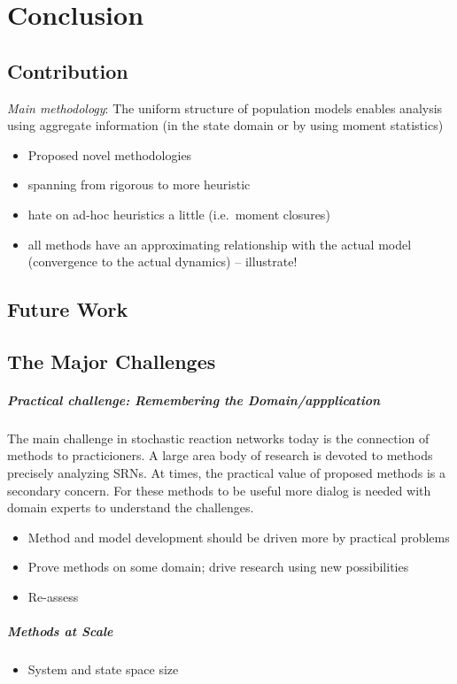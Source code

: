 \chapter{Conclusion}
\section{Contribution}
\emph{Main methodology}: The uniform structure of population models enables analysis using aggregate information (in the state domain or by using moment statistics)
\begin{itemize}
  \item Proposed novel methodologies
  \item spanning from rigorous to more heuristic
  \item hate on ad-hoc heuristics a little (i.e.\ moment closures)
  \item all methods have an approximating relationship with the actual model (convergence to the actual dynamics) -- illustrate!
\end{itemize}
\section{Future Work}
\section{The Major Challenges}
\paragraph{Practical challenge: Remembering the Domain/appplication} The main challenge in stochastic reaction networks today is the connection of methods to practicioners.
A large area body of research is devoted to methods precisely analyzing \acp{SRN}.
At times, the practical value of proposed methods is a secondary concern.
For these methods to be useful more dialog is needed with domain experts to understand the challenges.
\begin{itemize}
  \item Method and model development should be driven more by practical problems
  \item Prove methods on some domain; drive research using new possibilities
  \item Re-assess 
\end{itemize}

\paragraph{Methods at Scale}
\begin{itemize}
  \item System and state space size
\end{itemize}

